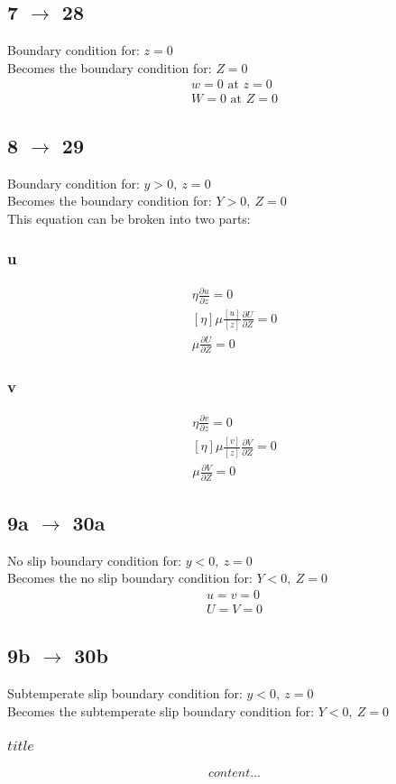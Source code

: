 \documentclass[10pt, letterpaper, twoside]{article}
\newcommand{\pd}[2]{\frac{\partial#1}{\partial#2}}
\begin{document}
	\subsection{7 $ \rightarrow $ 28}
	Boundary condition for: $ z = 0 $\\
	Becomes the boundary condition for: $ Z = 0 $
	\begin{gather*}
		w = 0 \text{ at } z = 0 \tag{7} \\
		W = 0 \text{ at } Z = 0 \tag{28}
	\end{gather*}
	\subsection{8 $ \rightarrow $ 29}
	Boundary condition for: $ y > 0,\ z = 0 $\\
	Becomes the boundary condition for: $ Y > 0,\ Z = 0 $\\
	This equation can be broken into two parts:
	\subsubsection{u}
	\begin{gather*}
		\eta\pd{u}{z} = 0 \tag{8a} \\
		\left[\eta\right]\mu\frac{\left[u\right]}{\left[z\right]}\pd{U}{Z} = 0\\
		\mu\pd{U}{Z} = 0 \tag{29a}
	\end{gather*}
	\subsubsection{v}
	\begin{gather*}
		\eta\pd{v}{z} = 0 \tag{8b} \\
		\left[\eta\right]\mu\frac{\left[v\right]}{\left[z\right]}\pd{V}{Z} = 0\\
		\mu\pd{V}{Z} = 0 \tag{29b}
	\end{gather*}
	\subsection{9a $ \rightarrow $ 30a}
	No slip boundary condition for: $ y < 0,\ z = 0 $\\
	Becomes the no slip boundary condition for: $ Y < 0,\ Z = 0 $
	\begin{gather*}
		u = v = 0 \tag{9a} \\
		U = V = 0 \tag{30a}
	\end{gather*}
	\subsection{9b $ \rightarrow $ 30b}
	Subtemperate slip boundary condition for: $ y < 0,\ z = 0 $\\
	Becomes the subtemperate slip boundary condition for: $ Y < 0,\ Z = 0 $
	\subsubsection{$ title $}
	\begin{gather*}
		content...
	\end{gather*}
	
\end{document}
